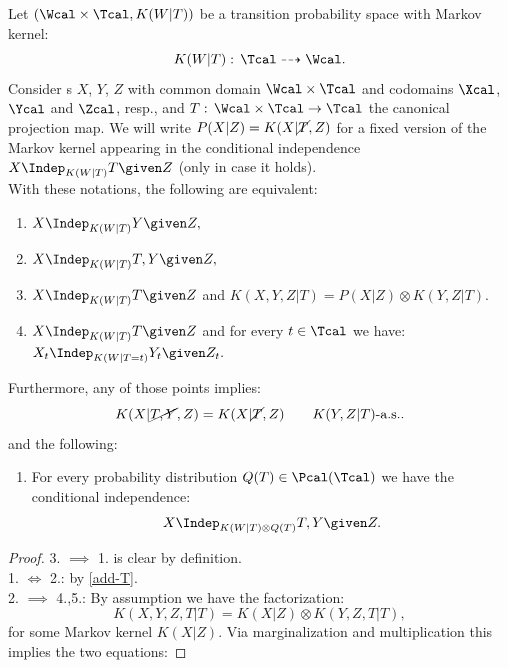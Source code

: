 \begin{Thm}
    \label{thm-ci-equivalences}
Let $(\Wcal \times \Tcal, K(W|T))$ be a transition probability space with Markov kernel:
\[K(W|T): \, \Tcal \dashrightarrow  \Wcal.\]
Consider \trv{}s $X$, $Y$, $Z$ with common domain $\Wcal\times \Tcal$ and codomains $\Xcal$, 
$\Ycal$ and $\Zcal$, resp., and $T:\,\Wcal\times \Tcal \to \Tcal$ the canonical projection map.
We will write $P(X|Z)=K(X|\cancel{T},Z)$ 
for a fixed version of the Markov kernel appearing in the conditional independence $X \Indep_{K(W|T)} T \given Z$ (only in case it holds).\\
With these notations, the following are equivalent:
\begin{enumerate}
    \item $\displaystyle X \Indep_{K(W|T)} Y \given Z,$
    \item $\displaystyle X \Indep_{K(W|T)} T, Y \given Z,$
    \item  $\displaystyle X \Indep_{K(W|T)} T \given Z$ and  $ \displaystyle K(X,Y,Z|T) = P(X|Z) \otimes K(Y,Z|T)$.
    \item  $\displaystyle  X \Indep_{K(W|T)} T \given Z$ and for every $t \in \Tcal$ we have:
            $\displaystyle X_t \Indep_{K(W|T=t)} Y_t \given Z_t.$
\end{enumerate}
Furthermore, any of those points implies:
\[ K(X|\cancel{T,Y},Z) = K(X|\cancel{T},Z) \qquad K(Y,Z|T)\text{-a.s.}.\]
and the following:
\begin{enumerate}[resume]
    \item For every probability distribution $Q(T) \in \Pcal(\Tcal)$ we have the conditional independence:
        \[ X \Indep_{K(W|T)\otimes Q(T) } T,Y \given Z.\]
\end{enumerate}
\begin{proof}
    3. $\implies$ 1. is clear by definition.\\
    1. $\iff$ 2.: by \ref{add-T}.\\
    2. $\implies$ 4.,5.:
    By assumption we have the factorization:
    \[K(X,Y,Z,T|T) = K(X|Z) \otimes K(Y,Z,T|T),\]
    for some Markov kernel $K(X|Z)$. Via marginalization and multiplication this implies the two equations:

\end{proof}
\end{Thm}
